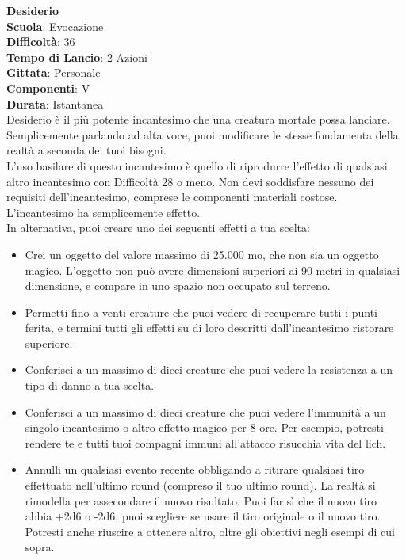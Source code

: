 \begin{multicols}{2}
\medskip\textbf{Desiderio}\\
\textbf{Scuola}: Evocazione\\
\textbf{Difficoltà}: 36\\
\textbf{Tempo di Lancio}: 2 Azioni\\
\textbf{Gittata}: Personale\\
\textbf{Componenti}: V\\
\textbf{Durata}: Istantanea\\
Desiderio è il più potente incantesimo che una creatura mortale possa lanciare. Semplicemente parlando ad alta voce, puoi modificare le stesse fondamenta della realtà a seconda dei tuoi bisogni. \\
L'uso basilare di questo incantesimo è quello di riprodurre l'effetto di qualsiasi altro incantesimo con Difficoltà 28 o meno. Non devi soddisfare nessuno dei requisiti dell'incantesimo, comprese le componenti materiali costose. L'incantesimo ha semplicemente effetto.\\
In alternativa, puoi creare uno dei seguenti effetti a tua scelta:
\begin{itemize}
	\item 
Crei un oggetto del valore massimo di 25.000 mo, che non sia un oggetto magico. L'oggetto non può avere dimensioni superiori ai 90 metri in qualsiasi dimensione, e compare in uno spazio non occupato sul terreno.
	\item 
Permetti fino a venti creature che puoi vedere di recuperare tutti i punti ferita, e termini tutti gli effetti su di loro descritti dall'incantesimo ristorare superiore. 
	\item 
Conferisci a un massimo di dieci creature che puoi vedere la resistenza a un tipo di danno a tua scelta.
	\item 
Conferisci a un massimo di dieci creature che puoi vedere l'immunità a un singolo incantesimo o altro effetto magico per 8 ore. Per esempio, potresti rendere te e tutti tuoi compagni immuni all'attacco risucchia vita del lich.
	\item 
Annulli un qualsiasi evento recente obbligando a ritirare qualsiasi tiro effettuato nell'ultimo round (compreso il tuo ultimo round). La realtà si rimodella per assecondare il nuovo risultato. Puoi far sì che il nuovo tiro abbia +2d6 o -2d6, puoi scegliere se usare il tiro originale o il nuovo tiro. Potresti anche riuscire a ottenere altro, oltre gli obiettivi negli esempi di cui sopra.\\
\end{itemize}

\end{multicols}
